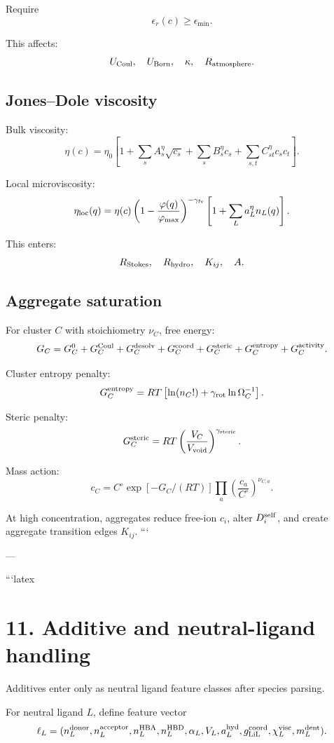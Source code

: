 Require
\[
\epsilon_r(c)\ge\epsilon_{\min}.
\]

This affects:
\[
U_{\rm Coul},\quad U_{\rm Born},\quad \kappa,\quad R_{\rm atmosphere}.
\]

\subsection{Jones--Dole viscosity}

Bulk viscosity:
\[
\eta(c)
=
\eta_0
\left[
1+
\sum_s A_s^{\eta}\sqrt{c_s}
+
\sum_s B_s^{\eta}c_s
+
\sum_{s,t}C_{st}^{\eta}c_sc_t
\right].
\]

Local microviscosity:
\[
\eta_{\rm loc}(q)
=
\eta(c)
\left(1-\frac{\varphi(q)}{\varphi_{\max}}\right)^{-\gamma_{\rm fv}}
\left[
1+
\sum_L a_L^{\eta}n_L(q)
\right].
\]

This enters:
\[
R_{\rm Stokes},\quad R_{\rm hydro},\quad K_{ij},\quad A.
\]

\subsection{Aggregate saturation}

For cluster \(C\) with stoichiometry \(\nu_C\), free energy:
\[
G_C
=
G_C^{0}
+
G_C^{\rm Coul}
+
G_C^{\rm desolv}
+
G_C^{\rm coord}
+
G_C^{\rm steric}
+
G_C^{\rm entropy}
+
G_C^{\rm activity}.
\]

Cluster entropy penalty:
\[
G_C^{\rm entropy}
=
RT\left[
\ln(n_C!)
+
\gamma_{\rm rot}\ln\Omega_C^{-1}
\right].
\]

Steric penalty:
\[
G_C^{\rm steric}
=
RT
\left(\frac{V_C}{V_{\rm void}}\right)^{\gamma_{\rm steric}}.
\]

Mass action:
\[
c_C
=
C^\circ
\exp[-G_C/(RT)]
\prod_a
\left(\frac{c_a}{C^\circ}\right)^{\nu_{C,a}}.
\]

At high concentration, aggregates reduce free-ion \(c_i\), alter \(D_i^{\rm self}\),
and create aggregate transition edges \(K_{ij}\).
```

---

```latex
\section{11. Additive and neutral-ligand handling}

Additives enter only as neutral ligand feature classes after species parsing.

For neutral ligand \(L\), define feature vector
\[
\ell_L=
(
n_L^{\rm donor},
n_L^{\rm acceptor},
n_L^{\rm HBA},
n_L^{\rm HBD},
\alpha_L,
V_L,
a_L^{\rm hyd},
g_{\rm LiL}^{\rm coord},
\chi_L^{\rm visc},
m_L^{\rm dent}
).
\]

